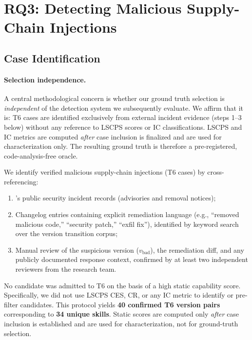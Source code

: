 
\section{RQ3: Detecting Malicious Supply-Chain Injections}
\label{sec:groundtruth}

\subsection{Case Identification}

\paragraph{Selection independence.}
A central methodological concern is whether our ground truth selection is
\emph{independent} of the detection system we subsequently evaluate.
We affirm that it is:
T6 cases are identified exclusively from external incident evidence
(steps 1--3 below) without any reference to LSCPS scores or IC classifications.
LSCPS and IC metrics are computed \emph{after} case inclusion is finalized
and are used for characterization only.
The resulting ground truth is therefore a pre-registered, code-analysis-free oracle.

We identify verified malicious supply-chain injections (T6 cases) by cross-referencing:
\begin{enumerate}
    \item \clawhub{}'s public security incident records (advisories and removal notices);
    \item Changelog entries containing explicit remediation language
          (e.g., ``removed malicious code,'' ``security patch,'' ``exfil fix''),
          identified by keyword search over the version transition corpus;
    \item Manual review of the suspicious version ($v_{\text{bad}}$),
          the remediation diff, and any publicly documented response context,
          confirmed by at least two independent reviewers from the research team.
\end{enumerate}

No candidate was admitted to T6 on the basis of a high static capability score.
Specifically, we did not use LSCPS CES, CR, or any IC metric to identify or
pre-filter candidates.
This protocol yields \textbf{40 confirmed T6 version pairs} corresponding to
\textbf{34 unique skills}. Static \lscps{} scores are computed only
\emph{after} case inclusion is established and are used for characterization,
not for ground-truth selection.


